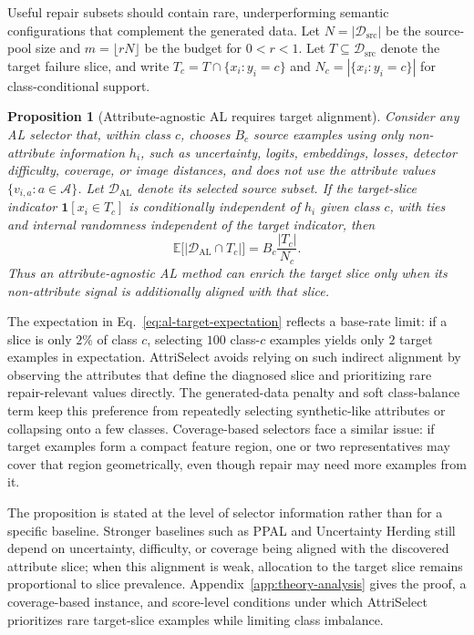 \documentclass{article}
\newcommand{\model}{AttriSelect\xspace}
\newcommand{\dataset}{\mathcal{D}}
\newcommand{\attrs}{\mathcal{A}}
\newtheorem{proposition}{Proposition}
\begin{document}
Useful repair subsets should contain rare, underperforming semantic configurations that complement the generated data. Let $N=|\dataset_{\mathrm{src}}|$ be the source-pool size and $m=\lfloor rN\rfloor$ be the budget for $0<r<1$. Let $T\subseteq\dataset_{\mathrm{src}}$ denote the target failure slice, and write $T_c=T\cap\{x_i:y_i=c\}$ and $N_c=|\{x_i:y_i=c\}|$ for class-conditional support.

\begin{proposition}[Attribute-agnostic AL requires target alignment]
\label{prop:al-target-alignment}
Consider any AL selector that, within class $c$, chooses $B_c$ source examples using only non-attribute information $h_i$, such as uncertainty, logits, embeddings, losses, detector difficulty, coverage, or image distances, and does not use the attribute values $\{v_{i,a}:a\in\attrs\}$. Let $\dataset_{\mathrm{AL}}$ denote its selected source subset. If the target-slice indicator $\mathbf{1}[x_i\in T_c]$ is conditionally independent of $h_i$ given class $c$, with ties and internal randomness independent of the target indicator, then
\begin{equation}
\label{eq:al-target-expectation}
\mathbb{E}\big[|\dataset_{\mathrm{AL}}\cap T_c|\big]
=
B_c\frac{|T_c|}{N_c}.
\end{equation}
Thus an attribute-agnostic AL method can enrich the target slice only when its non-attribute signal is additionally aligned with that slice.
\end{proposition}

The expectation in Eq.~\ref{eq:al-target-expectation} reflects a base-rate limit: if a slice is only $2\%$ of class $c$, selecting $100$ class-$c$ examples yields only $2$ target examples in expectation. \model avoids relying on such indirect alignment by observing the attributes that define the diagnosed slice and prioritizing rare repair-relevant values directly. The generated-data penalty and soft class-balance term keep this preference from repeatedly selecting synthetic-like attributes or collapsing onto a few classes. Coverage-based selectors face a similar issue: if target examples form a compact feature region, one or two representatives may cover that region geometrically, even though repair may need more examples from it.

The proposition is stated at the level of selector information rather than for a specific baseline. Stronger baselines such as PPAL and Uncertainty Herding still depend on uncertainty, difficulty, or coverage being aligned with the discovered attribute slice; when this alignment is weak, allocation to the target slice remains proportional to slice prevalence. Appendix~\ref{app:theory-analysis} gives the proof, a coverage-based instance, and score-level conditions under which \model prioritizes rare target-slice examples while limiting class imbalance.
\end{document}

